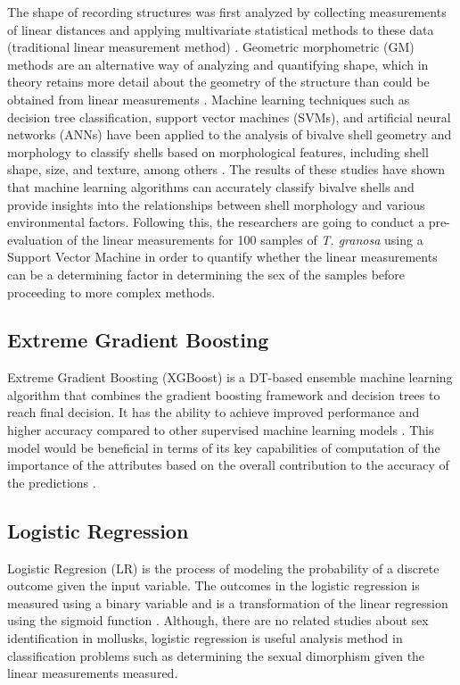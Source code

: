 The shape of recording structures was first analyzed by collecting measurements of linear distances and applying multivariate statistical methods to these data (traditional linear measurement method) \cite{rohlf1984}. Geometric morphometric (GM) methods are an alternative way of analyzing and quantifying shape, which in theory retains more detail about the geometry of the structure than could be obtained from linear measurements \cite{adams2004}. Machine learning techniques such as decision tree classification, support vector machines (SVMs), and artificial neural networks (ANNs) have been applied to the analysis of bivalve shell geometry and morphology to classify shells based on morphological features, including shell shape, size, and texture, among others \cite{kiel2021}. The results of these studies have shown that machine learning algorithms can accurately classify bivalve shells and provide insights into the relationships between shell morphology and various environmental factors.
Following this, the researchers are going to conduct a pre-evaluation of the linear measurements for 100 samples of \textit{T. granosa} using a Support Vector Machine in order to quantify whether the linear measurements can be a determining factor in determining the sex of the samples before proceeding to more complex methods. 

\subsection{Extreme Gradient Boosting}
Extreme Gradient Boosting (XGBoost) is a DT-based ensemble machine learning algorithm that combines the gradient boosting framework and decision trees to reach final decision. It has the ability to achieve improved performance and higher accuracy compared to other supervised machine learning models . This model would be beneficial in terms of its key capabilities of computation of the importance of the attributes based on the overall contribution to the accuracy of the predictions \cite{torres2023}. 

\subsection{Logistic Regression}

Logistic Regresion (LR) is the process of modeling the probability of a discrete outcome given the input variable. The outcomes in the logistic regression is measured using a binary variable and is a transformation of the linear regression using the sigmoid function \cite{cui2020}. Although, there are no related studies about sex identification in mollusks, logistic regression is useful analysis method in classification problems such as determining the sexual dimorphism given the linear measurements measured. 

